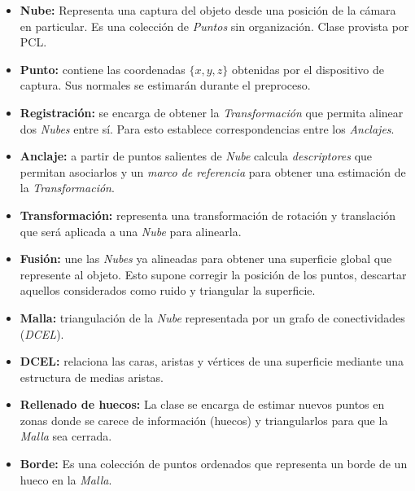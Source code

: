 \begin{itemize}
	\item {\bfseries Nube:}
		Representa una captura del objeto desde una posición de la cámara en particular.
		Es una colección de \emph{Puntos} sin organización. Clase provista por PCL.
	\item {\bfseries Punto:} contiene las coordenadas $\{x, y, z\}$ obtenidas por el
		dispositivo de captura. Sus normales se estimarán durante el preproceso.

	\item {\bfseries Registración:} se encarga de obtener la \emph{Transformación} que
		permita alinear dos \emph{Nubes} entre sí.  Para esto establece
		correspondencias entre los \emph{Anclajes}.
	\item {\bfseries Anclaje:} a partir de puntos salientes de \emph{Nube} calcula
		\emph{descriptores}  que permitan asociarlos y un
		\emph{marco de referencia} para obtener una estimación de la
		\emph{Transformación}.
	\item {\bfseries Transformación:} representa una transformación de rotación y translación
		que será aplicada a una \emph{Nube} para alinearla.

	\item {\bfseries Fusión:} une las \emph{Nubes} ya alineadas para
		obtener una superficie global que represente al objeto.
		Esto supone corregir la posición de los puntos, descartar
		aquellos considerados como ruido y triangular la superficie.
	\item {\bfseries Malla:} triangulación de la \emph{Nube}
		representada por un grafo de conectividades (\emph{DCEL}).
	\item {\bfseries DCEL:} relaciona las caras, aristas y vértices de una superficie mediante
		una estructura de medias aristas.

	\item {\bfseries Rellenado de huecos:} La clase se encarga de estimar
		nuevos puntos en zonas donde se carece de información (huecos)
		y triangularlos para que la \emph{Malla} sea cerrada.
	\item {\bfseries Borde:} Es una colección de puntos ordenados
		que representa un borde de un hueco en la \emph{Malla}.
\end{itemize}
